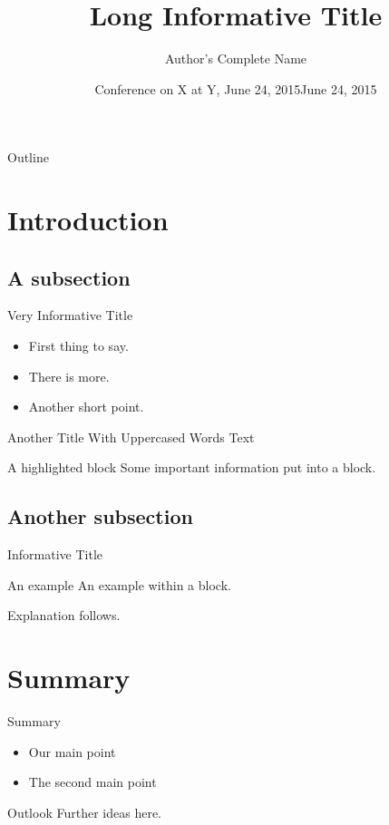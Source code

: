 \documentclass{beamer}
\begin{document}
\title[Short title]{Long Informative Title}
\author[Shortened name]{Author’s Complete Name}
\date[2015/06/24]{Conference on X at Y, June 24, 2015}
\date{June 24, 2015}
\begin{frame}
  \titlepage
\end{frame}
\begin{frame}{Outline}
  \tableofcontents[pausesections]
\end{frame}
\section{Introduction}
\subsection{A subsection}
\begin{frame}{Very Informative Title}
  \begin{itemize}
    \item First thing to say.
    \item There is more.
    \item Another short point.
  \end{itemize}
\end{frame}
\begin{frame}{Another Title With Uppercased Words}
  Text
  \begin{alertblock}{A highlighted block}
    Some important information put into a block.
  \end{alertblock}
\end{frame}
\subsection{Another subsection}
\begin{frame}{Informative Title}
  \begin{exampleblock}{An example}
    An example within a block.
  \end{exampleblock}
  Explanation follows.
\end{frame}
\section{Summary}
\begin{frame}{Summary}
  \begin{itemize}
    \item Our \alert{main point}
    \item The \alert{second main point}
  \end{itemize}
  \vfill
  \begin{block}{Outlook}
    Further ideas here.
  \end{block}
\end{frame}
\end{document}
